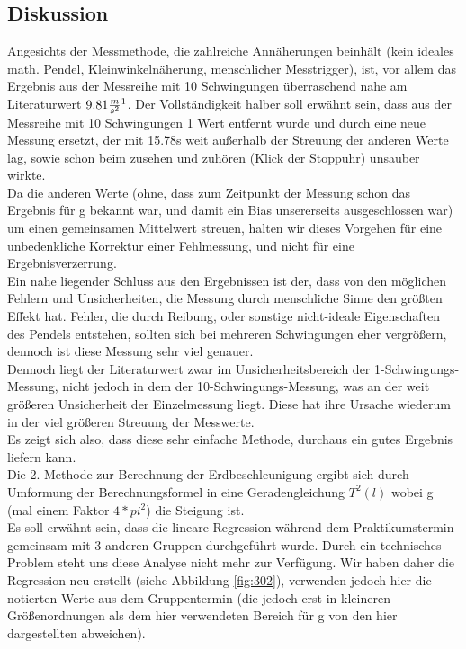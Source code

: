 \documentclass[12pt,a4paper]{article}
\begin{document}
\begin{multicols}{2}
\subsection{Diskussion}
Angesichts der Messmethode, die zahlreiche Annäherungen beinhält (kein ideales math. Pendel, Kleinwinkelnäherung, menschlicher Messtrigger), ist, vor allem das Ergebnis aus der Messreihe mit 10 Schwingungen überraschend nahe am Literaturwert
$9.81 \frac{m}{s^2}\footnote{\url{http:\\de.wikipedia.org/wiki/Erdbeschleunigung}}$.
Der Vollständigkeit halber soll erwähnt sein, dass aus der Messreihe mit 10 Schwingungen 1 Wert entfernt wurde und durch eine neue Messung ersetzt, der mit 15.78s weit außerhalb der Streuung der anderen Werte lag, sowie schon beim zusehen und zuhören (Klick der Stoppuhr) unsauber wirkte.\\
Da die anderen Werte (ohne, dass zum Zeitpunkt der Messung schon das Ergebnis für g bekannt war, und damit ein Bias unsererseits ausgeschlossen war) um einen gemeinsamen Mittelwert streuen, halten wir dieses Vorgehen für eine unbedenkliche Korrektur einer Fehlmessung, und nicht für eine Ergebnisverzerrung.\\
Ein nahe liegender Schluss aus den Ergebnissen ist der, dass von den möglichen Fehlern und Unsicherheiten, die Messung durch menschliche Sinne den größten Effekt hat. Fehler, die durch Reibung, oder sonstige nicht-ideale Eigenschaften des Pendels entstehen, sollten sich bei mehreren Schwingungen eher vergrößern, dennoch ist diese Messung sehr viel genauer.\\
Dennoch liegt der Literaturwert zwar im Unsicherheitsbereich der 1-Schwingungs-Messung, nicht jedoch in dem der 10-Schwingungs-Messung, was an der weit größeren Unsicherheit der Einzelmessung liegt. Diese hat ihre Ursache wiederum in der viel größeren Streuung der Messwerte. \\
Es zeigt sich also, dass diese sehr einfache Methode, durchaus ein gutes Ergebnis liefern kann.\\
Die 2. Methode zur Berechnung der Erdbeschleunigung ergibt sich durch Umformung der Berechnungsformel in eine Geradengleichung $T^2(l)$ wobei g (mal einem Faktor $4*pi^2$) die Steigung ist.\\
Es soll erwähnt sein, dass die lineare Regression während dem Praktikumstermin gemeinsam mit 3 anderen Gruppen durchgeführt wurde. Durch ein technisches Problem steht uns diese Analyse nicht mehr zur Verfügung. Wir haben daher die Regression neu erstellt (siehe Abbildung \ref{fig:302}), verwenden jedoch hier die notierten Werte aus dem Gruppentermin (die jedoch erst in kleineren Größenordnungen als dem hier verwendeten Bereich für g von den hier dargestellten abweichen).\\

\end{multicols}
\end{document}
